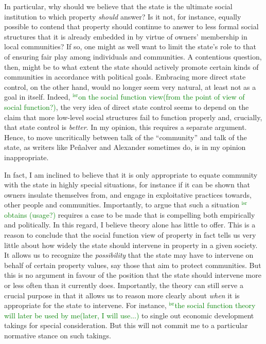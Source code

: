 \documentclass[12pt,a4paper]{book} %
\newcommand{\isr}[1]{\textcolor{green}{$^{\textrm{isr}}${#1}}}
\begin{document}
In particular, why should we believe that the state is the ultimate social institution to which property {\it should} answer? Is it not, for instance, equally possible to contend that property should continue to answer to less formal social structures that it is already embedded in by virtue of owners' membership in local communities? If so, one might as well want to limit the state's role to that of ensuring fair play among individuals and communities. A contentious question, then, might be to what extent the state should actively promote certain kinds of communities in accordance with political goals. Embracing more direct state control, on the other hand, would no longer seem very natural, at least not as a goal in itself. Indeed, \isr{on the social function view(from the point of view of social function?)}, the very idea of direct state control seems to depend on the claim that more low-level social structures fail to function properly and, crucially, that state control is {\it better}. In my opinion, this requires a separate argument. Hence, to move uncritically between talk of the ``community'' and talk of the state, as writers like Pe\~{n}alver and Alexander sometimes do, is in my opinion inappropriate.

In fact, I am inclined to believe that it is only appropriate to equate community with the state in highly special situations, for instance if it can be shown that owners insulate themselves from, and engage in exploitative practices towards, other people and communities. Importantly, to argue that such a situation \isr{obtains (usage?)} requires a case to be made that is compelling both empirically and politically. In this regard, I believe theory alone has little to offer. This is a reason to conclude that the social function view of property in fact tells us very little about how widely the state should intervene in property in a given society. It allows us to recognize the {\it possibility} that the state may have to intervene on behalf of certain property values, say those that aim to protect communities. But this is no argument in favour of the position that the state should intervene more or less often than it currently does. Importantly, the theory can still serve a crucial purpose in that it allows us to reason more clearly about {\it when} it is appropriate for the state to intervene. For instance, \isr{the social function theory will later be used by me(later, I will use...)} to single out economic development takings for special consideration. But this will not commit me to a particular normative stance on such takings.
\end{document}

